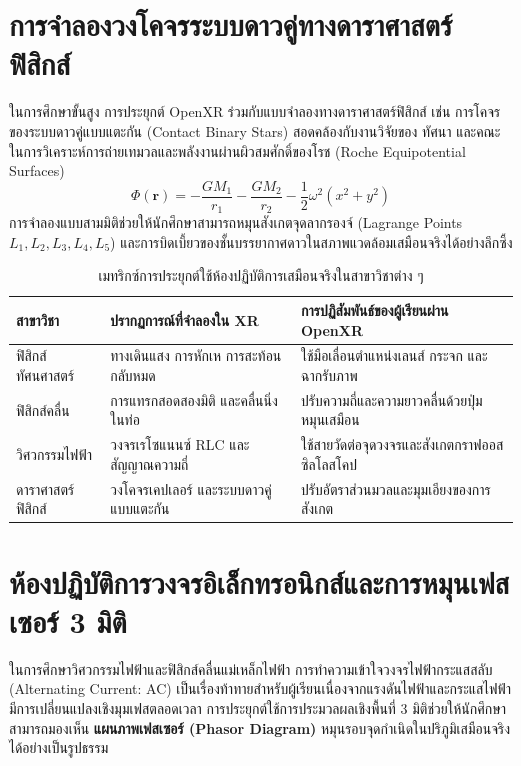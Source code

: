 \section{การจำลองวงโคจรระบบดาวคู่ทางดาราศาสตร์ฟิสิกส์}

ในการศึกษาขั้นสูง การประยุกต์ OpenXR ร่วมกับแบบจำลองทางดาราศาสตร์ฟิสิกส์ เช่น การโคจรของระบบดาวคู่แบบแตะกัน (Contact Binary Stars) สอดคล้องกับงานวิจัยของ ทัศนา และคณะ ในการวิเคราะห์การถ่ายเทมวลและพลังงานผ่านผิวสมศักดิ์ของโรช (Roche Equipotential Surfaces)
\begin{equation}
\Phi(\mathbf{r}) = -\frac{G M_1}{r_1} - \frac{G M_2}{r_2} - \frac{1}{2}\omega^2 (x^2 + y^2)
\end{equation}
การจำลองแบบสามมิติช่วยให้นักศึกษาสามารถหมุนสังเกตจุดลากรองจ์ (Lagrange Points $L_1, L_2, L_3, L_4, L_5$) และการบิดเบี้ยวของชั้นบรรยากาศดาวในสภาพแวดล้อมเสมือนจริงได้อย่างลึกซึ้ง

\begin{table}[htbp]
\centering
\caption{เมทริกซ์การประยุกต์ใช้ห้องปฏิบัติการเสมือนจริงในสาขาวิชาต่าง ๆ}
\label{tab:stem_matrices}
\begin{tabularx}{\textwidth}{lYY}
\toprule
\textbf{สาขาวิชา} & \textbf{ปรากฏการณ์ที่จำลองใน XR} & \textbf{การปฏิสัมพันธ์ของผู้เรียนผ่าน OpenXR} \\
\midrule
ฟิสิกส์ทัศนศาสตร์ & ทางเดินแสง การหักเห การสะท้อนกลับหมด & ใช้มือเลื่อนตำแหน่งเลนส์ กระจก และฉากรับภาพ \\
ฟิสิกส์คลื่น & การแทรกสอดสองมิติ และคลื่นนิ่งในท่อ & ปรับความถี่และความยาวคลื่นด้วยปุ่มหมุนเสมือน \\
วิศวกรรมไฟฟ้า & วงจรเรโซแนนซ์ RLC และสัญญาณความถี่ & ใช้สายวัดต่อจุดวงจรและสังเกตกราฟออสซิลโลสโคป \\
ดาราศาสตร์ฟิสิกส์ & วงโคจรเคปเลอร์ และระบบดาวคู่แบบแตะกัน & ปรับอัตราส่วนมวลและมุมเอียงของการสังเกต \\
\bottomrule
\end{tabularx}
\end{table}

\section{ห้องปฏิบัติการวงจรอิเล็กทรอนิกส์และการหมุนเฟสเซอร์ 3 มิติ}

ในการศึกษาวิศวกรรมไฟฟ้าและฟิสิกส์คลื่นแม่เหล็กไฟฟ้า การทำความเข้าใจวงจรไฟฟ้ากระแสสลับ (Alternating Current: AC) เป็นเรื่องท้าทายสำหรับผู้เรียนเนื่องจากแรงดันไฟฟ้าและกระแสไฟฟ้ามีการเปลี่ยนแปลงเชิงมุมเฟสตลอดเวลา การประยุกต์ใช้การประมวลผลเชิงพื้นที่ 3 มิติช่วยให้นักศึกษาสามารถมองเห็น \textbf{แผนภาพเฟสเซอร์ (Phasor Diagram)} หมุนรอบจุดกำเนิดในปริภูมิเสมือนจริงได้อย่างเป็นรูปธรรม

